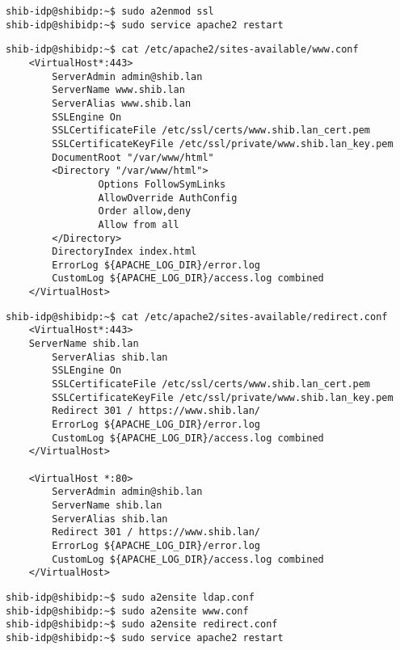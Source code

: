 \begin{lstlisting}
shib-idp@shibidp:~$ sudo a2enmod ssl
shib-idp@shibidp:~$ sudo service apache2 restart
\end{lstlisting}

\begin{lstlisting}
shib-idp@shibidp:~$ cat /etc/apache2/sites-available/www.conf
	<VirtualHost*:443>
		ServerAdmin admin@shib.lan
		ServerName www.shib.lan
		ServerAlias www.shib.lan
		SSLEngine On
		SSLCertificateFile /etc/ssl/certs/www.shib.lan_cert.pem
		SSLCertificateKeyFile /etc/ssl/private/www.shib.lan_key.pem
		DocumentRoot "/var/www/html"
		<Directory "/var/www/html">
				Options FollowSymLinks
				AllowOverride AuthConfig
				Order allow,deny
				Allow from all
		</Directory>
		DirectoryIndex index.html
		ErrorLog ${APACHE_LOG_DIR}/error.log
		CustomLog ${APACHE_LOG_DIR}/access.log combined
	</VirtualHost>
\end{lstlisting}
\begin{lstlisting}
shib-idp@shibidp:~$ cat /etc/apache2/sites-available/redirect.conf
	<VirtualHost*:443>
	ServerName shib.lan
		ServerAlias shib.lan
		SSLEngine On
		SSLCertificateFile /etc/ssl/certs/www.shib.lan_cert.pem
		SSLCertificateKeyFile /etc/ssl/private/www.shib.lan_key.pem
		Redirect 301 / https://www.shib.lan/
		ErrorLog ${APACHE_LOG_DIR}/error.log
		CustomLog ${APACHE_LOG_DIR}/access.log combined
	</VirtualHost>

	<VirtualHost *:80>
		ServerAdmin admin@shib.lan
		ServerName shib.lan
		ServerAlias shib.lan
		Redirect 301 / https://www.shib.lan/
		ErrorLog ${APACHE_LOG_DIR}/error.log
		CustomLog ${APACHE_LOG_DIR}/access.log combined
	</VirtualHost>
\end{lstlisting}
\begin{lstlisting}
shib-idp@shibidp:~$ sudo a2ensite ldap.conf
shib-idp@shibidp:~$ sudo a2ensite www.conf
shib-idp@shibidp:~$ sudo a2ensite redirect.conf
shib-idp@shibidp:~$ sudo service apache2 restart
\end{lstlisting}

